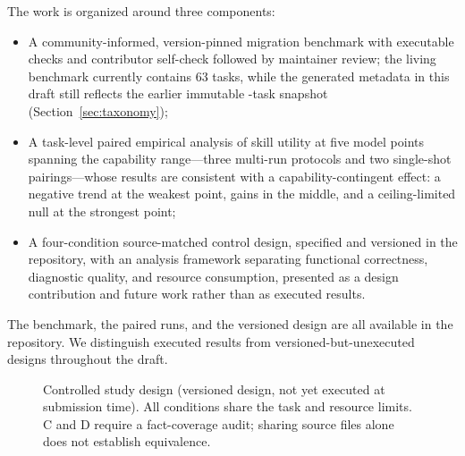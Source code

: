 \documentclass[11pt]{article}
\begin{document}
The work is organized around three components:
\begin{itemize}
\item A community-informed, version-pinned migration benchmark with executable checks and contributor self-check followed by maintainer review; the living benchmark currently contains 63 tasks, while the generated metadata in this draft still reflects the earlier immutable \BenchmarkTaskCount{}-task snapshot (Section~\ref{sec:taxonomy});
\item A task-level paired empirical analysis of skill utility at five model points spanning the capability range---three multi-run protocols and two single-shot pairings---whose results are consistent with a capability-contingent effect: a negative trend at the weakest point, gains in the middle, and a ceiling-limited null at the strongest point;
\item A four-condition source-matched control design, specified and versioned in the repository, with an analysis framework separating functional correctness, diagnostic quality, and resource consumption, presented as a design contribution and future work rather than as executed results.
\end{itemize}
The benchmark, the paired runs, and the versioned design are all available in the repository.
We distinguish executed results from versioned-but-unexecuted designs throughout the draft.

\begin{figure}[t]
\centering
\small
{}
\caption{Controlled study design (versioned design, not yet executed at submission time). All conditions share the task and resource limits. C and D require a fact-coverage audit; sharing source files alone does not establish equivalence.}
\label{fig:design}
\end{figure}
\end{document}
